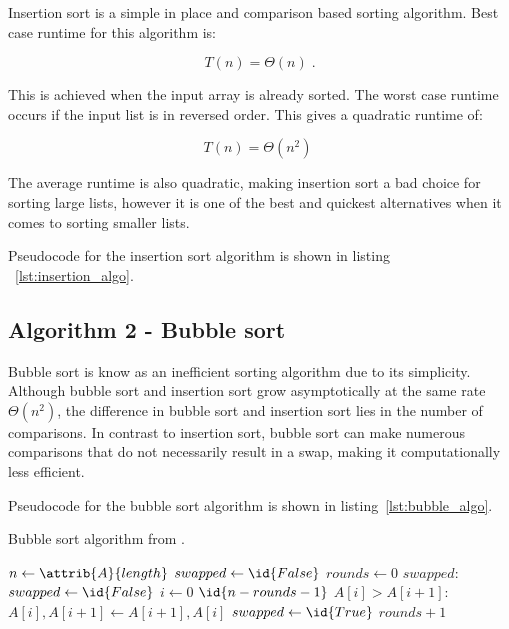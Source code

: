 \documentclass[sigconf, nonacm, natbib, screen, balance=False]{acmart}
\begin{document}
Insertion sort is a simple in place and comparison based sorting algorithm. Best case runtime for this algorithm is:

\begin{equation}
  T(n) = \Theta(n) \;.  \label{eq:ins_sort_best}
\end{equation}

This is achieved when the input array is already sorted. The worst case runtime occurs if the input list is in reversed order. This gives a quadratic runtime of:

\begin{equation}
  T(n) = \Theta(n^2) \;  \label{eq:ins_sort_best}
\end{equation}

The average runtime is also quadratic, making insertion sort a bad choice for sorting large lists, however it is one of the best and quickest alternatives when it comes to sorting smaller lists. 

Pseudocode for the insertion sort algorithm is shown in
listing ~\ref{lst:insertion_algo}. 

\subsection{Algorithm 2 - Bubble sort}\label{sec:algo2}

Bubble sort is know as an inefficient sorting algorithm due to its simplicity. Although bubble sort and insertion sort  grow asymptotically at the same rate $\Theta(n^2)$, the difference in bubble sort and insertion sort lies in the number of comparisons. In contrast to insertion sort, bubble sort can make numerous comparisons that do not necessarily result in a swap, making it computationally less efficient.

Pseudocode for the bubble sort algorithm is shown in listing~\ref{lst:bubble_algo}. 

\begin{listing}
  \caption{Bubble sort algorithm from \citet[Ch.~2.1]{CLRS_2009}.}
  \label{lst:bubble_algo}
 
  \begin{codebox}
    \li $n \gets \attrib{A}{length}$
    \li $swapped \gets \id{False}$
    \li $rounds \gets 0$
    \li \While $swapped:$
    \li \Do
    $swapped \gets \id{False}$
    \li \For $i \gets 0 $ \To $\id{n - rounds - 1}$
    \li     \Do
    \If $A[i] > A[i+1]:$
    \li     \Do
    $A[i], A[i+1] \gets A[i+1], A[i]$
    \li $swapped \gets \id{True}$
    \End
    \End    
    \li       $rounds + 1$
    \End
  \end{codebox}
\end{listing}
\end{document}
